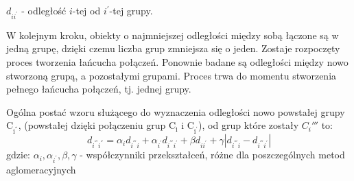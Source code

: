 \documentclass[12pt,a4paper]{report}
\begin{document}
$d_{ii^{'}}$ - odległość $i$-tej od $i^{'}$-tej grupy.

W kolejnym kroku, obiekty o najmniejszej odległości między sobą łączone są w jedną grupę, dzięki czemu liczba grup zmniejsza się o jeden. Zostaje rozpoczęty proces tworzenia łańcucha połączeń. Ponownie badane są odległości między nowo stworzoną grupą, a pozostałymi grupami. Proces trwa do momentu stworzenia pełnego łańcucha połączeń, tj. jednej grupy. 


Ogólna postać wzoru służącego do wyznaczenia odległości nowo powstałej grupy $\mathrm{C_{i^{''}}}$, (powstałej dzięki połączeniu grup $\mathrm{C_{i}}$ i $\mathrm{C_{i^{'}}}$), od grup które zostały ${C_i{'''}}$ to:
$$
d_{i^{'''}i^{''}}=\alpha_{i}d_{i^{'''}i} + \alpha_{i^{'}}d_{i^{'''}i^{'}} + \beta d_{ii^{'}} + \gamma|d_{i^{'''}i} - d_{i^{'''}i^{'}}| 
$$
gdzie:
$\alpha_{i},\alpha_{i^{'}}, \beta, \gamma$ - współczynniki przekształceń, różne dla poszczególnych metod aglomeracyjnych
\end{document}
